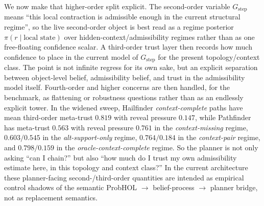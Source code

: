 \documentclass[11pt,openany]{report}
\begin{document}
We now make that higher-order split explicit.  The second-order variable
$G_{\mathrm{step}}$ means ``this local contraction is admissible enough
in the current structural regime'', so the live second-order object is
best read as a regime posterior $\pi(r \mid \text{local state})$ over
hidden-context/admissibility regimes rather than as one free-floating
confidence scalar.  A third-order trust layer then records how much
confidence to place in the current model of $G_{\mathrm{step}}$ for the
present topology/context class.  The point is not infinite regress for
its own sake, but an explicit separation between object-level belief,
admissibility belief, and trust in the admissibility model itself.
Fourth-order and higher concerns are then handled, for the benchmark, as
flattening or robustness questions rather than as an endlessly explicit
tower.  In the widened sweep, Hailfinder
\emph{context-complete} paths have mean third-order meta-trust $0.819$
with reveal pressure $0.147$, while Pathfinder has meta-trust $0.563$
with reveal pressure $0.761$ in the \emph{context-missing} regime,
$0.603/0.545$ in the \emph{alt-support-only} regime,
$0.764/0.184$ in the \emph{context-pair} regime, and
$0.798/0.159$ in the \emph{oracle-context-complete} regime.  So the
planner is not only asking ``can I chain?'' but also ``how much do I
trust my own admissibility estimate here, in this topology and context
class?''  In the current architecture these planner-facing
second-/third-order quantities are intended as empirical control
shadows of the semantic ProbHOL $\rightarrow$ belief-process
$\rightarrow$ planner bridge, not as replacement semantics.
\end{document}
